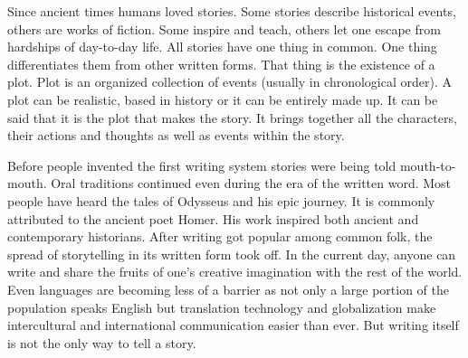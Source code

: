 \label{chapter:introduction}
Since ancient times humans loved stories.
Some stories describe historical events, others are works of fiction.
Some inspire and teach, others let one escape from hardships of day-to-day life.
All stories have one thing in common.
One thing differentiates them from other written forms.
That thing is the existence of a plot.
Plot is an organized collection of events (usually in chronological order).
A plot can be realistic, based in history or it can be entirely made up.
It can be said that it is the plot that makes the story.
It brings together all the characters, their actions and thoughts as well as events within the story.

Before people invented the first writing system stories were being told mouth-to-mouth.
Oral traditions continued even during the era of the written word.
Most people have heard the tales of Odysseus and his epic journey.
It is commonly attributed to the ancient poet Homer.
His work inspired both ancient and contemporary historians\cite{marincola2007odysseus}.
After writing got popular among common folk, the spread of storytelling in its written form took off.
In the current day, anyone can write and share the fruits of one's creative imagination with the rest of the world.
Even languages are becoming less of a barrier as not only a large portion of the population speaks English but translation technology and globalization make intercultural and international communication easier than ever\cite{coulmas1987speak}.
But writing itself is not the only way to tell a story.

